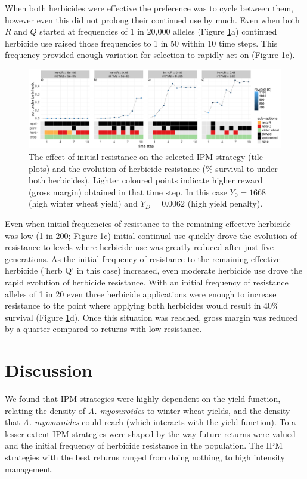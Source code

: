 \documentclass[12pt, a4paper]{article}
\begin{document}
When both herbicides were effective the preference was to cycle between them, however even this did not prolong their continued use by much. Even when both $R$ and $Q$ started at frequencies of 1 in 20,000 alleles (Figure \ref{fig:int_res}a) continued herbicide use raised those frequencies to 1 in 50 within 10 time steps. This frequency provided enough variation for selection to rapidly act on (Figure \ref{fig:int_res}c).
\begin{figure}[!ht]
	\includegraphics[width=160mm]{MS_figs/int_res_strat_resist.pdf}
	\caption{The effect of initial resistance on the selected IPM strategy (tile plots) and the evolution of herbicide resistance (\% survival to under both herbicides). Lighter coloured points indicate higher reward (gross margin) obtained in that time step. In this case $Y_0 = 1668$ (high winter wheat yield) and $Y_D = 0.0062$ (high yield penalty).}
	\label{fig:int_res} 
\end{figure}

Even when initial frequencies of resistance to the remaining effective herbicide was low (1 in 200; Figure \ref{fig:int_res}c) initial continual use quickly drove the evolution of resistance to levels where herbicide use was greatly reduced after just five generations. As the initial frequency of resistance to the remaining effective herbicide ('herb Q' in this case) increased, even moderate herbicide use drove the rapid evolution of herbicide resistance. With an initial frequency of resistance alleles of 1 in 20 even three herbicide applications were enough to increase resistance to the point where applying both herbicides would result in 40\% survival (Figure \ref{fig:int_res}d). Once this situation was reached, gross margin was reduced by a quarter compared to returns with low resistance. 

\section*{Discussion}
We found that IPM strategies were highly dependent on the yield function, relating the density of \textit{A. myosuroides} to winter wheat yields, and the density that \textit{A. myosuroides} could reach (which interacts with the yield function). To a lesser extent IPM strategies were shaped by the way future returns were valued and the initial frequency of herbicide resistance in the population. The IPM strategies with the best returns ranged from doing nothing, to high intensity management. 
\end{document}
